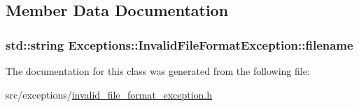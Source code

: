 \subsection{Member Data Documentation}
\hypertarget{class_exceptions_1_1_invalid_file_format_exception_a7c035c95548acec2b3b3693cf746c1e2}{}
\subsubsection[{filename}]{\setlength{\rightskip}{0pt plus 5cm}std\+::string Exceptions\+::\+Invalid\+File\+Format\+Exception\+::filename\hspace{0.3cm}{\ttfamily [private]}}\label{class_exceptions_1_1_invalid_file_format_exception_a7c035c95548acec2b3b3693cf746c1e2}


The documentation for this class was generated from the following file\+:\begin{DoxyCompactItemize}
\item 
src/exceptions/\hyperlink{invalid__file__format__exception_8h}{invalid\+\_\+file\+\_\+format\+\_\+exception.\+h}\end{DoxyCompactItemize}
